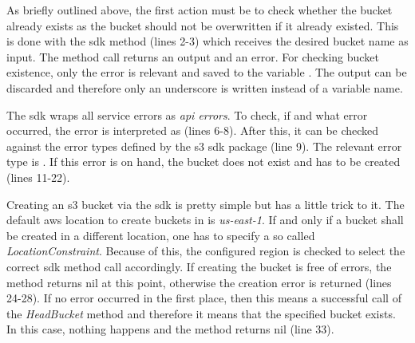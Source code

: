 As briefly outlined above, the first action must be to check whether the bucket already exists as the bucket should not be overwritten if it already existed.
This is done with the \ac{sdk} method  (lines 2-3) which receives the desired bucket name as input.
The method call returns an output and an error.
For checking bucket existence, only the error is relevant and saved to the variable .
The output can be discarded and therefore only an underscore is written instead of a variable name.

The \ac{sdk} wraps all service errors as \emph{\ac{api} errors}.
To check, if and what error occurred, the error is interpreted as  (lines 6-8).
After this, it can be checked against the error types defined by the \ac{s3} \ac{sdk} package (line 9).
The relevant error type is .
If this error is on hand, the bucket does not exist and has to be created (lines 11-22).

Creating an \ac{s3} bucket via the \ac{sdk} is pretty simple but has a little trick to it.
The default \ac{aws} location to create buckets in is \emph{us-east-1}.
If and only if a bucket shall be created in a different location, one has to specify a so called \emph{LocationConstraint}.
Because of this, the configured region is checked to select the correct \ac{sdk} method call accordingly.
If creating the bucket is free of errors, the method returns nil at this point, otherwise the creation error is returned (lines 24-28).
If no error occurred in the first place, then this means a successful call of the \emph{HeadBucket} method and therefore it means that the specified bucket exists.
In this case, nothing happens and the method returns nil (line 33).



